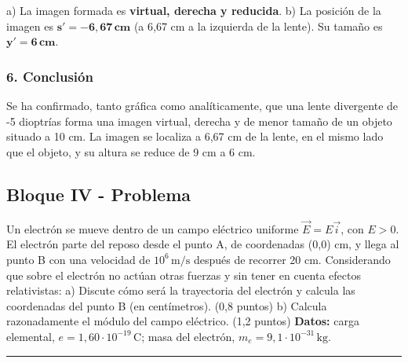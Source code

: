 \begin{cajaresultado}
a) La imagen formada es \textbf{virtual, derecha y reducida}.
b) La posición de la imagen es $\boldsymbol{s' = -6,67\,\textbf{cm}}$ (a 6,67 cm a la izquierda de la lente). Su tamaño es $\boldsymbol{y' = 6\,\textbf{cm}}$.
\end{cajaresultado}

\subsubsection*{6. Conclusión}
\begin{cajaconclusion}
Se ha confirmado, tanto gráfica como analíticamente, que una lente divergente de -5 dioptrías forma una imagen virtual, derecha y de menor tamaño de un objeto situado a 10 cm. La imagen se localiza a 6,67 cm de la lente, en el mismo lado que el objeto, y su altura se reduce de 9 cm a 6 cm.
\end{cajaconclusion}

\newpage

\subsection{Bloque IV - Problema}
\label{subsec:A4_2014_jul_ext}

\begin{cajaenunciado}
Un electrón se mueve dentro de un campo eléctrico uniforme $\vec{E}=E\vec{i}$, con $E>0$. El electrón parte del reposo desde el punto A, de coordenadas (0,0) cm, y llega al punto B con una velocidad de $10^{6}\,\text{m/s}$ después de recorrer 20 cm. Considerando que sobre el electrón no actúan otras fuerzas y sin tener en cuenta efectos relativistas:
a) Discute cómo será la trayectoria del electrón y calcula las coordenadas del punto B (en centímetros). (0,8 puntos) 
b) Calcula razonadamente el módulo del campo eléctrico. (1,2 puntos) 
\textbf{Datos:} carga elemental, $e=1,60\cdot10^{-19}\,\text{C}$; masa del electrón, $m_{e}=9,1\cdot10^{-31}\,\text{kg}$. 
\end{cajaenunciado}
\hrule


